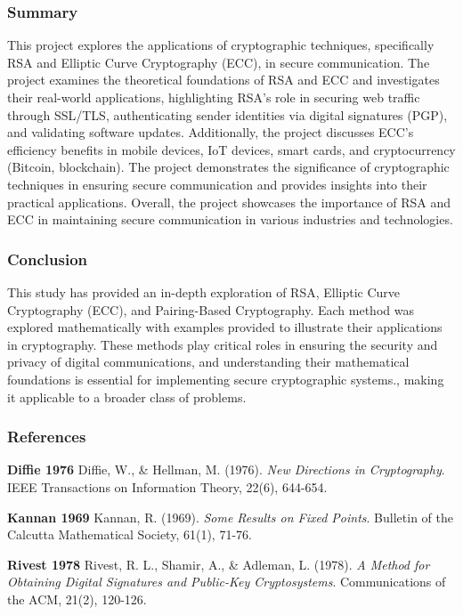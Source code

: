 \documentclass{beamer}
\begin{document}
\begin{frame}
\frametitle{Summary}
This project explores the applications of cryptographic techniques, specifically RSA and Elliptic Curve Cryptography (ECC), in secure communication. The project examines the theoretical foundations of RSA and ECC and investigates their real-world applications, highlighting RSA's role in securing web traffic through SSL/TLS, authenticating sender identities via digital signatures (PGP), and validating software updates. Additionally, the project discusses ECC's efficiency benefits in mobile devices, IoT devices, smart cards, and cryptocurrency (Bitcoin, blockchain). The project demonstrates the significance of cryptographic techniques in ensuring secure communication and provides insights into their practical applications. Overall, the project showcases the importance of RSA and ECC in maintaining secure communication in various industries and technologies.
\end{frame}


\begin{frame}
\frametitle{Conclusion}
This study has provided an in-depth exploration of RSA, Elliptic Curve Cryptography (ECC), and Pairing-Based Cryptography. Each method was explored mathematically with examples provided to illustrate their applications in cryptography. These methods play critical roles in ensuring the security and privacy of digital communications, and understanding their mathematical foundations is essential for implementing secure cryptographic systems., making it applicable to a broader class of problems.
\end{frame}

\begin{frame}
\frametitle{References} 

\textbf{Diffie 1976}
Diffie, W., \& Hellman, M. (1976). 
\textit{New Directions in Cryptography}. 
IEEE Transactions on Information Theory, 22(6), 644-654.

\textbf{Kannan 1969}
Kannan, R. (1969). 
\textit{Some Results on Fixed Points}. 
Bulletin of the Calcutta Mathematical Society, 61(1), 71-76.

\textbf{Rivest 1978}
Rivest, R. L., Shamir, A., \& Adleman, L. (1978). 
\textit{A Method for Obtaining Digital Signatures and Public-Key Cryptosystems}. 
Communications of the ACM, 21(2), 120-126.
\end{frame}
\end{document}
